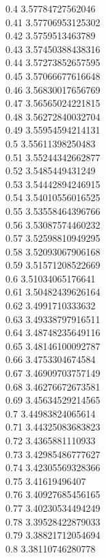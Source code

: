 {0.4	3.57784727562046\\
0.41	3.57706953125302\\
0.42	3.5759513463789\\
0.43	3.57450388438316\\
0.44	3.57273852657595\\
0.45	3.57066677616648\\
0.46	3.56830017656769\\
0.47	3.56565024221815\\
0.48	3.56272840032704\\
0.49	3.55954594214131\\
0.5	3.55611398250483\\
0.51	3.55244342662877\\
0.52	3.5485449431249\\
0.53	3.54442894246915\\
0.54	3.54010556016525\\
0.55	3.53558464396766\\
0.56	3.53087574460232\\
0.57	3.52598810949295\\
0.58	3.52093067906168\\
0.59	3.51571208522669\\
0.6	3.51034065176641\\
0.61	3.50482439626164\\
0.62	3.4991710333632\\
0.63	3.49338797916511\\
0.64	3.48748235649116\\
0.65	3.48146100092787\\
0.66	3.4753304674584\\
0.67	3.46909703757149\\
0.68	3.46276672673581\\
0.69	3.45634529214565\\
0.7	3.44983824065614\\
0.71	3.44325083683823\\
0.72	3.4365881110933\\
0.73	3.42985486777627\\
0.74	3.42305569328366\\
0.75	3.41619496407\\
0.76	3.40927685456165\\
0.77	3.40230534494249\\
0.78	3.39528422879033\\
0.79	3.38821712054694\\
0.8	3.38110746280778\\
}
